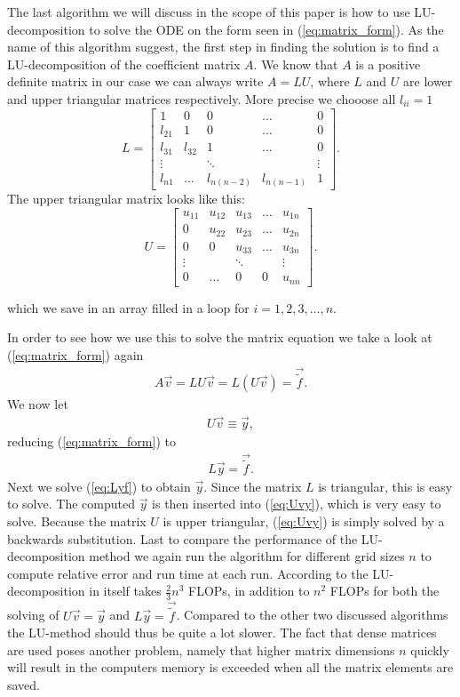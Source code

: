 \documentclass[twocolumn]{aastex62}
\begin{document}
The last algorithm we will discuss in the scope of this paper is how to use LU-decomposition to solve the ODE on the form seen in (\ref{eq:matrix_form}). As the name of this algorithm suggest, the first step in finding the solution is to find a LU-decomposition of the coefficient matrix $A$. We know that $A$ is a positive definite matrix in our case we can always write $A = LU$, where $L$ and $U$ are lower and upper triangular matrices respectively. More precise we chooose all $l_{ii} = 1$
$$L = 
\begin{bmatrix}
	1 & 0 & 0 & \hdots & 0\\
	l_{21} & 1 & 0 & \hdots & 0\\
	l_{31} & l_{32} & 1 &\hdots & 0\\
	\vdots & & \ddots & & \vdots\\
	l_{n1} & \hdots & l_{n(n-2)} & l_{n(n-1)} & 1
\end{bmatrix}.
$$
The upper triangular matrix looks like this:
$$U = 
\begin{bmatrix}
	u_{11} & u_{12} & u_{13} & \hdots & u_{1n}\\
	0 & u_{22} & u_{23} & \hdots & u_{2n}\\
	0 & 0 & u_{33} &\hdots & u_{3n}\\
	\vdots & & \ddots & & \vdots\\
	0 & \hdots & 0 & 0 & u_{nn}
\end{bmatrix}.
$$

which we save in an array filled in a loop for $i = 1, 2, 3,\ldots, n$.

In order to see how we use this to solve the matrix equation we take a look at (\ref{eq:matrix_form}) again
\begin{align}
	A\vec{v} = LU\vec{v} = L(U\vec{v}) = \vec{\tilde{f}}.
\end{align}
We now let 
\begin{align}
	U\vec{v} \equiv \vec{y},
	\label{eq:Uvy}
\end{align}
reducing (\ref{eq:matrix_form}) to
\begin{align}
	L\vec{y} = \vec{\tilde{f}}.
	\label{eq:Lyf}
\end{align} 
Next we solve (\ref{eq:Lyf}) to obtain $\vec{y}$. Since the matrix $L$ is triangular, this is easy to solve. The computed $\vec{y}$ is then inserted into (\ref{eq:Uvy}), which is very easy to solve. Because the matrix $U$ is upper triangular, (\ref{eq:Uvy}) is simply solved by a backwards substitution. 
Last to compare the performance of the LU-decomposition method we again run the algorithm for different grid sizes $n$ to compute relative error and run time at each run. According to \citep{Boyd:2004} the LU-decomposition in itself takes $\frac{2}{3}n^3$ FLOPs, in addition to $n^2$ FLOPs for both the solving of $U\vec{v} = \vec{y}$ and $L\vec{y} = \vec{\tilde{f}}$. Compared to the other two discussed algorithms the LU-method should thus be quite a lot slower. The fact that dense matrices are used poses another problem, namely that higher matrix dimensions $n$ quickly will result in the computers memory is exceeded when all the matrix elements are saved.
\end{document}
